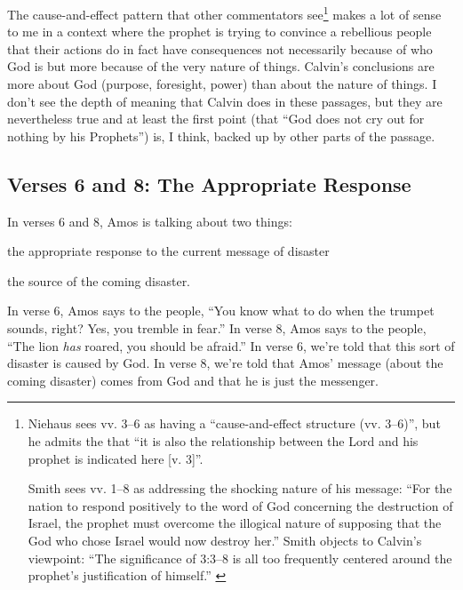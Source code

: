 The cause-and-effect pattern that other commentators see\footnote{%
    Niehaus sees vv. 3--6 as having a \enquote{cause-and-effect structure (vv.
    3--6)}, but he admits the that \enquote{it is also the relationship between
    the Lord and his prophet is indicated here [v. 3]}.
    \autocite[378]{mccomiskey:2009}

    Smith sees vv. 1--8 as addressing the shocking nature of his message:
    \enquote{For the nation to respond positively to the word of God concerning
    the destruction of Israel, the prophet must overcome the illogical nature of
    supposing that the God who chose Israel would now destroy her.}
    \autocite[135]{smith:2017} Smith objects to Calvin's viewpoint: \enquote{The
    significance of 3:3--8 is all too frequently centered around the prophet's
    justification of himself.} \autocite[146]{smith:2017}
} makes a lot of sense to me in a context where the prophet is trying to
convince a rebellious people that their actions do in fact have consequences not
necessarily because of who God is but more because of the very nature of things.
Calvin's conclusions are more about God (purpose, foresight, power) than about
the nature of things. I don't see the depth of meaning that Calvin does in these
passages, but they are nevertheless true and at least the first point (that
\enquote{God does not cry out for nothing by his Prophets}) is, I think, backed
up by other parts of the passage.

\subsection{Verses 6 and 8: The Appropriate Response}

In verses 6 and 8, Amos is talking about two things:
\begin{inparaenum}[(1)]
\item the appropriate response to the current message of disaster
\item the source of the coming disaster.
\end{inparaenum}

In verse 6, Amos says to the people, \enquote{You know what to do when the
trumpet sounds, right? Yes, you tremble in fear.} In verse 8, Amos says to the
people, \enquote{The lion \textit{has} roared, you should be afraid.} In verse
6, we're told that this sort of disaster is caused by God. In verse 8, we're
told that Amos' message (about the coming disaster) comes from God and that he
is just the messenger.


